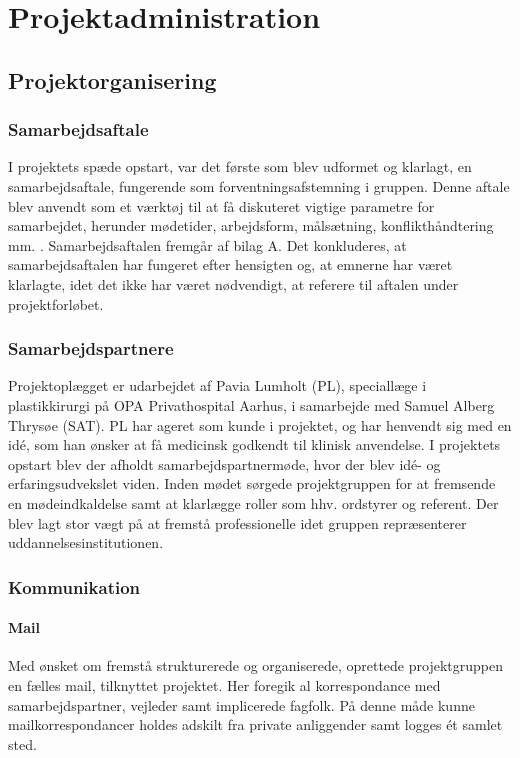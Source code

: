 \chapter{Projektadministration}

\section{Projektorganisering}
\subsection{Samarbejdsaftale}
I projektets spæde opstart, var det første som blev udformet og klarlagt, en samarbejdsaftale, fungerende som forventningsafstemning i gruppen. Denne aftale blev anvendt som et værktøj til at få diskuteret vigtige parametre for samarbejdet, herunder mødetider, arbejdsform, målsætning, konflikthåndtering mm. \citep{RefWorks:12}. Samarbejdsaftalen fremgår af bilag A. 
Det konkluderes, at samarbejdsaftalen har fungeret efter hensigten og, at emnerne har været klarlagte, idet det ikke har været nødvendigt, at referere til aftalen under projektforløbet.   
	
\subsection{Samarbejdspartnere}

	Projektoplægget er udarbejdet af Pavia Lumholt (PL), speciallæge i plastikkirurgi på OPA Privathospital Aarhus, i samarbejde med Samuel Alberg Thrysøe (SAT). PL har ageret som kunde i projektet, og har henvendt sig med en idé, som han ønsker at få medicinsk godkendt til klinisk anvendelse. I projektets opstart blev der afholdt samarbejdspartnermøde, hvor der blev idé- og erfaringsudvekslet viden. Inden mødet sørgede projektgruppen for at fremsende en mødeindkaldelse samt at klarlægge roller som hhv. ordstyrer og referent. Der blev lagt stor vægt på at fremstå professionelle idet gruppen repræsenterer uddannelsesinstitutionen.        
	
\subsection{Kommunikation}

	\subsubsection{Mail}
	Med ønsket om fremstå strukturerede og organiserede, oprettede projektgruppen en fælles mail, tilknyttet projektet. Her foregik al korrespondance med samarbejdspartner, vejleder samt implicerede fagfolk. På denne måde kunne mailkorrespondancer holdes adskilt fra private anliggender samt logges ét samlet sted. 
	
